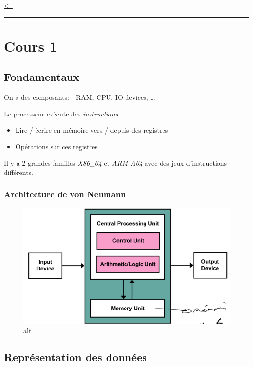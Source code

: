 \href{../README.md}{\textless--}

\begin{center}\rule{0.5\linewidth}{0.5pt}\end{center}

\section{Cours 1}\label{cours-1}

\subsection{Fondamentaux}\label{fondamentaux}

On a des composants: - RAM, CPU, IO devices, \ldots{}

Le processeur exécute des \emph{instructions}.

\begin{itemize}
\tightlist
\item
  Lire / écrire en mémoire vers / depuis des registres
\item
  Opérations sur ces registres
\end{itemize}

Il y a 2 grandes familles \emph{X86\_64} et \emph{ARM A64} avec des jeux
d'instructions différents.

\subsubsection{Architecture de von
Neumann}\label{architecture-de-von-neumann}

\begin{figure}
\centering
\includegraphics{image-5.png}
\caption{alt}
\end{figure}

\subsection{Représentation des
données}\label{repruxe9sentation-des-donnuxe9es}

